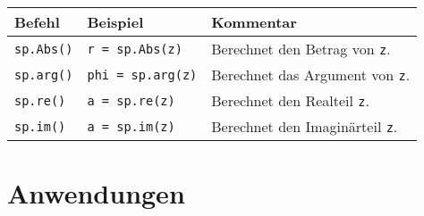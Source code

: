 \begin{table}[H]
    \centering
    \begin{tabular}{|p{3cm}|p{6cm}|p{6cm}|}
        \hline
    \textbf{Befehl} & \textbf{Beispiel} & \textbf{Kommentar} \\ \hline
    \texttt{sp.Abs()} & \texttt{r = sp.Abs(z)} & Berechnet den Betrag von \texttt{z}. \\ \hline
    \texttt{sp.arg()} & \texttt{phi = sp.arg(z)} & Berechnet das Argument von \texttt{z}. \\ \hline
    \texttt{sp.re()} & \texttt{a = sp.re(z)} & Berechnet den Realteil \texttt{z}. \\ \hline
    \texttt{sp.im()} & \texttt{a = sp.im(z)} & Berechnet den Imaginärteil \texttt{z}. \\ \hline

    \end{tabular}
\end{table}





\section{Anwendungen}\label{sec:anwendungen}


